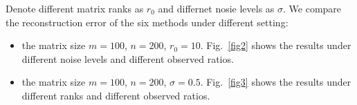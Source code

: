 \documentclass{article}
\begin{document}
{Denote different matrix ranks as $r_0$ and differnet nosie levels as $\sigma$.
We compare the reconstruction error of the six methods under different setting:
\begin{itemize}
	\item  the matrix size $m =100$, $n=200$, $r_0 = 10$. Fig.~\ref{fig2} shows the results under different noise levels and different observed ratios.
	\item  the matrix size $m =100$, $n=200$, $\sigma = 0.5$. Fig.~\ref{fig3} shows the results under different ranks and different observed ratios.
\end{itemize}

\begin{figure}[htbp]
	\label{fig2ori}
	\centering
	\quad\quad
	\\
	\quad\quad
	\\

\end{figure}}
\end{document}
